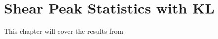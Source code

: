 \chapter{Shear Peak Statistics with KL}

This chapter will cover the results from \citep{Vanderplas2012}